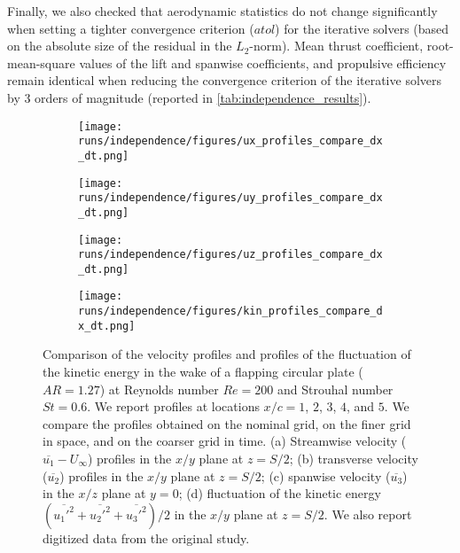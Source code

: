 Finally, we also checked that aerodynamic statistics do not change significantly when setting a tighter convergence criterion ($atol$) for the iterative solvers (based on the absolute size of the residual in the $L_2$-norm).
Mean thrust coefficient, root-mean-square values of the lift and spanwise coefficients, and propulsive efficiency remain identical when reducing the convergence criterion of the iterative solvers by 3 orders of magnitude (reported in \cref{tab:independence_results}).

\begin{figure}
  \centering
  \begin{subfigure}[c]{0.45\textwidth}
    \centering
    \texttt{[image: runs/independence/figures/ux\_profiles\_compare\_dx\_dt.png]}
    \caption{}
    \label{fig:independence_profiles:streamwise}
  \end{subfigure}
  \hfill
  \begin{subfigure}[c]{0.45\textwidth}
    \centering
    \texttt{[image: runs/independence/figures/uy\_profiles\_compare\_dx\_dt.png]}
    \caption{}
    \label{fig:independence_profiles:transverse}
  \end{subfigure}
  \vspace{1cm}
  \begin{subfigure}[c]{0.45\textwidth}
    \centering
    \texttt{[image: runs/independence/figures/uz\_profiles\_compare\_dx\_dt.png]}
    \caption{}
    \label{fig:independence_profiles:spanwise}
  \end{subfigure}
  \hfill
  \begin{subfigure}[c]{0.45\textwidth}
    \centering
    \texttt{[image: runs/independence/figures/kin\_profiles\_compare\_dx\_dt.png]}
    \caption{}
    \label{fig:independence_profiles:kinetic}
  \end{subfigure}
  \caption{Comparison of the velocity profiles and profiles of the fluctuation of the kinetic energy in the wake of a flapping circular plate ($AR = 1.27$) at Reynolds number $Re = 200$ and Strouhal number $St = 0.6$. We report profiles at locations $x / c = 1$, $2$, $3$, $4$, and $5$. We compare the profiles obtained on the nominal grid, on the finer grid in space, and on the coarser grid in time. (a) Streamwise velocity ($\overline{u_1} - U_\infty$) profiles in the $x/y$ plane at $z = S / 2$; (b) transverse velocity ($\overline{u_2}$) profiles in the $x/y$ plane at $z = S / 2$; (c) spanwise velocity ($\overline{u_3}$) in the $x/z$ plane at $y = 0$; (d) fluctuation of the kinetic energy $( \overline{{u_1'}^2} + \overline{{u_2'}^2} + \overline{{u_3'}^2} ) / 2$ in the $x/y$ plane at $z = S / 2$. We also report digitized data from the original study.\supercite{li_dong_2016}}
  \label{fig:independence_profiles}
\end{figure}

